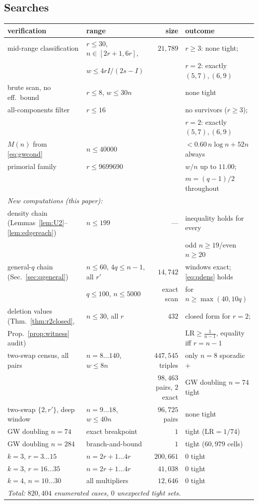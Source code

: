 \documentclass[11pt]{article}
\theoremstyle{definition}
\newcommand{\LR}{\mathrm{LR}}
\begin{document}
\subsection{Searches}
\begin{center}
\small
\begin{tabular}{llrl}
\toprule
verification & range & size & outcome\\
\midrule
mid-range classification & $r\le30$, $n\in[2r+1,6r]$, & $21{,}789$ & $r\ge3$: none tight;\\
 & $w\le 4rI/(2s-I)$ & & $r=2$: exactly $(5,7),(6,9)$\\
brute scan, no eff.\ bound & $r\le8$, $w\le30n$ & & none tight\\
all-components filter & $r\le16$ & & no survivors ($r\ge3$);\\
 & & & $r=2$: exactly $(5,7),(6,9)$\\
$M(n)$ from \eqref{eq:gwcond} & $n\le40000$ & & $<0.60\,n\log n+52n$ always\\
primorial family & $r\le9699690$ & & $w/n$ up to $11.00$;\\
 & & & $m=(q-1)/2$ throughout\\
\midrule
\multicolumn{4}{l}{\emph{New computations (this paper):}}\\
density chain (Lemmas~\ref{lem:U2}--\ref{lem:edgereach}) & $n\le199$ & --- & inequality holds for every\\
 & & & odd $n\ge19$/even $n\ge20$\\
general-$q$ chain (Sec.~\ref{sec:qgeneral}) & $n\le60$, $4q\le n-1$, all $r'$ & $14{,}742$ & windows exact; \eqref{eq:qdens} holds\\
 & $q\le100$, $n\le5000$ & exact scan & for $n\ge\max(40,10q)$\\
deletion values (Thm.~\ref{thm:r2closed}, & $n\le30$, all $r$ & $432$ & closed form for $r=2$;\\
Prop.~\ref{prop:witness} audit) & & & $\LR\ge\frac1{n-1}$, equality iff $r=n-1$\\
two-swap census, all pairs & $n=8\ldots140$, $w\le8n$ & $447{,}545$ triples & only $n=8$ sporadic +\\
 & & $98{,}463$ pairs, $2$ exact & GW doubling $n=74$ tight\\
two-swap $\{2,r'\}$, deep window & $n=9\ldots18$, $w\le40n$ & $96{,}725$ pairs & none tight\\
GW doubling $n=74$ & exact breakpoint & $1$ & tight ($\LR=1/74$)\\
GW doubling $n=284$ & branch-and-bound & $1$ & tight ($60{,}979$ cells)\\
$k=3$, $r=3\ldots15$ & $n=2r{+}1\ldots4r$ & $200{,}661$ & 0 tight\\
$k=3$, $r=16\ldots35$ & $n=2r{+}1\ldots4r$ & $41{,}038$ & 0 tight\\
$k=4$, $n=10\ldots30$ & all multipliers & $12{,}646$ & 0 tight\\
\midrule
\multicolumn{4}{l}{\emph{Total: $820{,}404$ enumerated cases, $0$ unexpected tight sets.}}\\
\bottomrule
\end{tabular}
\end{center}
\end{document}
